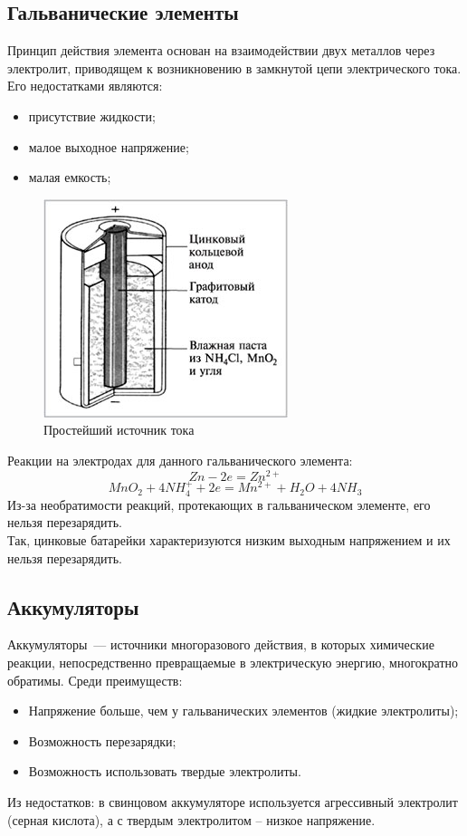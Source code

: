 \documentclass[14pt,a4paper]{scrartcl}
\begin{document}
\subsection*{Гальванические элементы}

Принцип действия элемента основан на взаимодействии двух металлов через электролит, приводящем к возникновению в замкнутой цепи электрического тока.\\
Его недостатками являются:
\begin{itemize}
	\item присутствие жидкости;
	\item малое выходное напряжение; 
	\item малая емкость;
\end{itemize}
\begin{figure}[H]
	\includegraphics[scale=1]{galel.jpg}
	\centering
	\caption{Простейший источник тока}
\end{figure}
Реакции на электродах для данного гальванического элемента:
$$ Zn - 2e = Zn^{2+} $$
$$ MnO_2 + 4NH_4^+ + 2e = Mn^{2+} + H_2O + 4NH_3 $$
Из-за необратимости реакций, протекающих в гальваническом элементе, его нельзя перезарядить.\\
Так, цинковые батарейки характеризуются низким выходным напряжением и их нельзя перезарядить.
\subsection*{Аккумуляторы}
Аккумуляторы — источники многоразового действия, в которых химические реакции,
непосредственно превращаемые в электрическую энергию, многократно обратимы.
Среди преимуществ: 
\begin{itemize}
	\item Напряжение больше, чем у гальванических элементов (жидкие электролиты);
	\item Возможность перезарядки;
	\item Возможность использовать твердые электролиты.
\end{itemize}
Из недостатков: в свинцовом аккумуляторе используется агрессивный электролит (серная кислота), а с твердым электролитом -- низкое напряжение.
\end{document}
